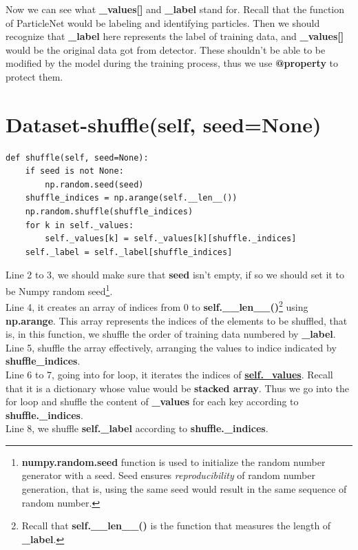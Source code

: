 \documentclass[12pt]{report}
\numberwithin{equation}{section}
\begin{document}
Now we can see what \textbf{\_values[]} and \textbf{\_label} stand for.
 Recall that the function of ParticleNet would be labeling and identifying particles.
 Then we should recognize that \textbf{\_label} here represents the label of training data, and \textbf{\_values[]} would be the original data got from detector.
These shouldn't be able to be modified by the model during the training process, thus we use \textbf{@property} to protect them.

\section{Dataset-shuffle(self, seed=None)}
\begin{lstlisting}
def shuffle(self, seed=None):
    if seed is not None:
        np.random.seed(seed)
    shuffle_indices = np.arange(self.__len__())
    np.random.shuffle(shuffle_indices)
    for k in self._values:
        self._values[k] = self._values[k][shuffle._indices]
    self._label = self._label[shuffle_indices]
\end{lstlisting}

Line 2 to 3, we should make sure that \textbf{seed} isn't empty, if so we should set it to be Numpy random seed\footnote{\textbf{numpy.random.seed} function is used to initialize the random number generator with a seed. Seed ensures \textit{reproducibility} of random number generation, that is, using the same seed would result in the same sequence of random number.}.
\\\indent Line 4, it creates an array of indices from 0 to \textbf{self.\_\_len\_\_()}\footnote{Recall that \textbf{self.\_\_len\_\_()} is the function that measures the length of \textbf{\_label}.} using \textbf{np.arange}. 
This array represents the indices of the elements to be shuffled, that is, in this function, we shuffle the order of training data numbered by \textbf{\_label}.
\\\indent Line 5, shuffle the array effectively, arranging the values to indice indicated by \textbf{shuffle\_indices}.
\\\indent Line 6 to 7, going into for loop, it iterates the indices of \hyperref[sec:values]{\textbf{self.\_values}}. 
Recall that it is a dictionary whose value would be \textbf{stacked array}. Thus we go into the for loop and shuffle the content of \textbf{\_values} for each key according to \textbf{shuffle.\_indices}.
\\\indent Line 8, we shuffle \textbf{self.\_label} according to \textbf{shuffle.\_indices}.
\end{document}
